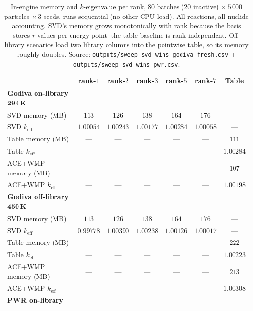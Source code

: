 \begin{table}[t]
\centering
\caption{In-engine memory and $k$-eigenvalue per rank, $80$ batches
($20$ inactive) $\times\,5\,000$ particles $\times\,3$ seeds, runs
sequential (no other CPU load). All-reactions, all-nuclide accounting.
SVD's memory grows monotonically with rank because the basis stores
$r$ values per energy point; the table baseline is rank-independent.
Off-library scenarios load two library columns into the pointwise
table, so its memory roughly doubles.
Source: \texttt{outputs/sweep\_svd\_wins\_godiva\_fresh.csv} +
\texttt{outputs/sweep\_svd\_wins\_pwr.csv}.}
\label{tab:mem_rank}
\begin{tabular}{@{}lcccccc@{}}
\toprule
& rank-$1$ & rank-$2$ & rank-$3$ & rank-$5$ & rank-$7$ & Table \\
\midrule
\textbf{Godiva on-library 294\,K} & & & & & & \\
\quad SVD memory (MB)            & $113$ & $126$ & $138$ & $164$ & $176$ & --- \\
\quad SVD $k_\text{eff}$         & $1.00054$ & $1.00243$ & $1.00177$ & $1.00284$ & $1.00058$ & --- \\
\quad Table memory (MB)          & ---   & ---   & ---   & ---   & ---   & $111$ \\
\quad Table $k_\text{eff}$       & ---   & ---   & ---   & ---   & ---   & $1.00284$ \\
\quad ACE+WMP memory (MB)        & ---   & ---   & ---   & ---   & ---   & $107$ \\
\quad ACE+WMP $k_\text{eff}$     & ---   & ---   & ---   & ---   & ---   & $1.00198$ \\
\midrule
\textbf{Godiva off-library 450\,K} & & & & & & \\
\quad SVD memory (MB)            & $113$ & $126$ & $138$ & $164$ & $176$ & --- \\
\quad SVD $k_\text{eff}$         & $0.99778$ & $1.00390$ & $1.00238$ & $1.00126$ & $1.00017$ & --- \\
\quad Table memory (MB)          & ---   & ---   & ---   & ---   & ---   & $222$ \\
\quad Table $k_\text{eff}$       & ---   & ---   & ---   & ---   & ---   & $1.00223$ \\
\quad ACE+WMP memory (MB)        & ---   & ---   & ---   & ---   & ---   & $213$ \\
\quad ACE+WMP $k_\text{eff}$     & ---   & ---   & ---   & ---   & ---   & $1.00308$ \\
\midrule
\textbf{PWR on-library} & & & & & & \\

\end{tabular}
\end{table}
